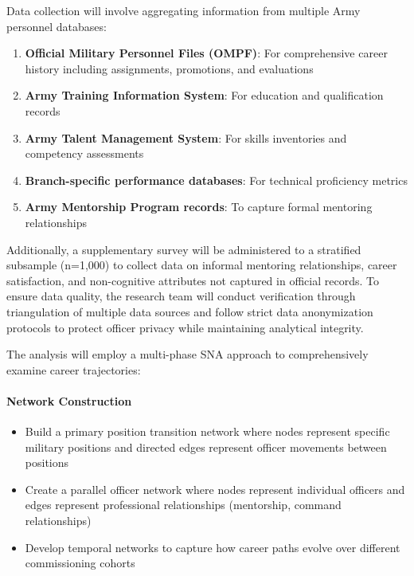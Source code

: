 \documentclass[../main.tex]{subfiles}
\begin{document}
Data collection will involve aggregating information from multiple Army personnel databases:
\begin{enumerate}
\item \textbf{Official Military Personnel Files (OMPF)}: For comprehensive career history including assignments, promotions, and evaluations
\item \textbf{Army Training Information System}: For education and qualification records
\item \textbf{Army Talent Management System}: For skills inventories and competency assessments
\item \textbf{Branch-specific performance databases}: For technical proficiency metrics
\item \textbf{Army Mentorship Program records}: To capture formal mentoring relationships
\end{enumerate}

Additionally, a supplementary survey will be administered to a stratified subsample (n=1,000) to collect data on informal mentoring relationships, career satisfaction, and non-cognitive attributes not captured in official records. To ensure data quality, the research team will conduct verification through triangulation of multiple data sources and follow strict data anonymization protocols to protect officer privacy while maintaining analytical integrity.


The analysis will employ a multi-phase SNA approach to comprehensively examine career trajectories:

\paragraph{Network Construction}
\begin{itemize}
\item Build a primary position transition network where nodes represent specific military positions and directed edges represent officer movements between positions
\item Create a parallel officer network where nodes represent individual officers and edges represent professional relationships (mentorship, command relationships)
\item Develop temporal networks to capture how career paths evolve over different commissioning cohorts
\end{itemize}
\end{document}
